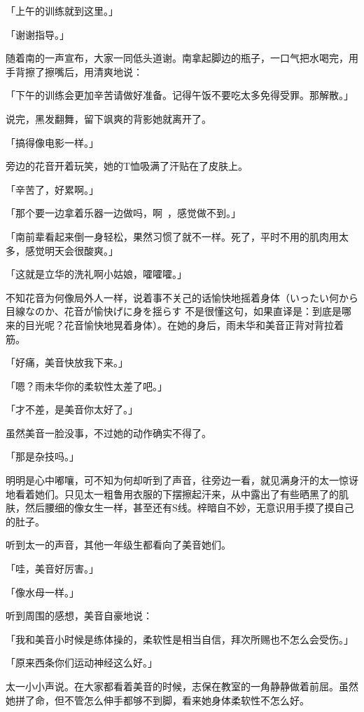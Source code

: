 \documentclass[UTF8]{ctexart}
\begin{document}
    「上午的训练就到这里。」

    「谢谢指导。」

    随着南的一声宣布，大家一同低头道谢。南拿起脚边的瓶子，一口气把水喝完，用手背擦了擦嘴后，用清爽地说：

    「下午的训练会更加辛苦请做好准备。记得午饭不要吃太多免得受罪。那解散。」

    说完，黑发翻舞，留下飒爽的背影她就离开了。

    「搞得像电影一样。」

    旁边的花音开着玩笑，她的T恤吸满了汗贴在了皮肤上。

    「辛苦了，好累啊。」

    「那个要一边拿着乐器一边做吗，啊~，感觉做不到。」

    「南前辈看起来倒一身轻松，果然习惯了就不一样。死了，平时不用的肌肉用太多，感觉明天会很酸爽。」

    「这就是立华的洗礼啊小姑娘，嚯嚯嚯。」

    不知花音为何像局外人一样，说着事不关己的话愉快地摇着身体（いったい何から目線なのか、花音が愉快げに身を揺らす 不是很懂这句，如果直译是：到底是哪来的目光呢？花音愉快地晃着身体）。在她的身后，雨未华和美音正背对背拉着筋。

    「好痛，美音快放我下来。」

    「嗯？雨未华你的柔软性太差了吧。」

    「才不差，是美音你太好了。」

    虽然美音一脸没事，不过她的动作确实不得了。

    「那是杂技吗。」

    明明是心中嘟嚷，可不知为何却听到了声音，往旁边一看，就见满身汗的太一惊讶地看着她们。只见太一粗鲁用衣服的下摆擦起汗来，从中露出了有些晒黑了的肌肤，然后腰细的像女生一样，甚至还有S线。梓暗自不妙，无意识用手摸了摸自己的肚子。

    听到太一的声音，其他一年级生都看向了美音她们。

    「哇，美音好厉害。」

    「像水母一样。」

    听到周围的感想，美音自豪地说：

    「我和美音小时候是练体操的，柔软性是相当自信，拜次所赐也不怎么会受伤。」

    「原来西条你们运动神经这么好。」

    太一小小声说。在大家都看着美音的时候，志保在教室的一角静静做着前屈。虽然她拼了命，但不管怎么伸手都够不到脚，看来她身体柔软性不怎么好。
\end{document}
